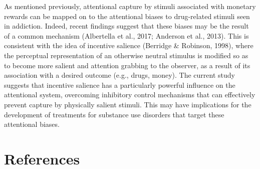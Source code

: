 \documentclass[man, a4paper, noextraspace, 11pt,floatsintext]{apa6}
\begin{document}
As mentioned previously, attentional capture by stimuli associated with
monetary rewards can be mapped on to the attentional biases to
drug-related stimuli seen in addiction. Indeed, recent findings suggest
that these biases may be the result of a common mechanism (Albertella et
al., 2017; Anderson et al., 2013). This is consistent with the idea of
incentive salience (Berridge \& Robinson, 1998), where the perceptual
representation of an otherwise neutral stimulus is modified so as to
become more salient and attention grabbing to the observer, as a result
of its association with a desired outcome (e.g., drugs, money). The
current study suggests that incentive salience has a particularly
powerful influence on the attentional system, overcoming inhibitory
control mechanisms that can effectively prevent capture by physically
salient stimuli. This may have implications for the development of
treatments for substance use disorders that target these attentional
biases.



























































\newpage

\section{References}\label{references}

\begingroup
\setlength{\parindent}{-0.5in} \setlength{\leftskip}{0.5in}
\end{document}
